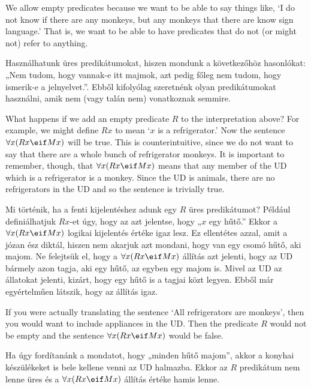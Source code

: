 We allow empty predicates because we want to be able to say things like, `I do not know if there are any monkeys, but any monkeys that there are know sign language.' That is, we want to be able to have predicates that do not (or might not) refer to anything.

Használhatunk üres predikátumokat, hiszen mondunk a következőhöz hasonlókat: „Nem tudom, hogy vannak-e itt majmok, azt pedig főleg nem tudom, hogy ismerik-e a jelnyelvet.”. Ebből kifolyólag szeretnénk olyan predikátumokat használni, amik nem (vagy talán nem) vonatkoznak semmire.


What happens if we add an empty predicate $R$ to the interpretation above? For example, we might define $Rx$ to mean `$x$ is a refrigerator.' Now the sentence $\forall x(Rx \eif Mx)$ will be true. This is counterintuitive, since we do not want to say that there are a whole bunch of refrigerator monkeys. It is important to remember, though, that $\forall x(Rx \eif Mx)$ means that any member of the UD which is a refrigerator is a monkey. Since the UD is animals, there are no refrigerators in the UD and so the sentence is trivially true.

Mi történik, ha a fenti kijelentéshez adunk egy $R$ üres predikátumot? Például definiálhatjuk $Rx$-et úgy, hogy az azt jelentse, hogy „$x$ egy hűtő.” Ekkor a $\forall x(Rx \eif Mx)$ logikai kijelentés értéke igaz lesz. Ez ellentétes azzal, amit a józan ész diktál, hiszen nem akarjuk azt mondani, hogy van egy csomó hűtő, aki majom. Ne felejtsük el, hogy a  $\forall x(Rx \eif Mx)$ állítás azt jelenti, hogy az UD bármely azon tagja, aki egy hűtő, az egyben egy majom is. Mivel az UD az állatokat jelenti, kizárt, hogy egy hűtő is a tagjai közt legyen. Ebből már egyértelműen látszik, hogy az állítás igaz.

If you were actually translating the sentence `All refrigerators are monkeys', then you would want to include appliances in the UD. Then the predicate $R$ would not be empty and the sentence $\forall x(Rx \eif Mx)$ would be false.

Ha úgy fordítanánk a mondatot, hogy „minden hűtő majom”, akkor a konyhai készülékeket is bele kellene venni az UD halmazba. Ekkor az $R$ predikátum nem lenne üres és a $\forall x(Rx \eif Mx)$ állítás értéke hamis lenne.

